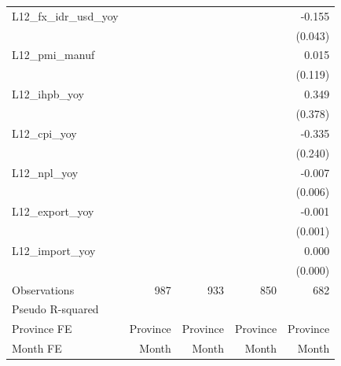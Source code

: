 {\begin{tabular}{l*{4}{D{.}{.}{-1}}}
\addlinespace
L12\_fx\_idr\_usd\_yoy&                  &                  &                  &   -0.155\sym{***}\\
                &                  &                  &                  &  (0.043)         \\
\addlinespace
L12\_pmi\_manuf   &                  &                  &                  &    0.015         \\
                &                  &                  &                  &  (0.119)         \\
\addlinespace
L12\_ihpb\_yoy    &                  &                  &                  &    0.349         \\
                &                  &                  &                  &  (0.378)         \\
\addlinespace
L12\_cpi\_yoy     &                  &                  &                  &   -0.335         \\
                &                  &                  &                  &  (0.240)         \\
\addlinespace
L12\_npl\_yoy     &                  &                  &                  &   -0.007         \\
                &                  &                  &                  &  (0.006)         \\
\addlinespace
L12\_export\_yoy  &                  &                  &                  &   -0.001         \\
                &                  &                  &                  &  (0.001)         \\
\addlinespace
L12\_import\_yoy  &                  &                  &                  &    0.000         \\
                &                  &                  &                  &  (0.000)         \\
\midrule
Observations    &      987         &      933         &      850         &      682         \\
Pseudo R-squared&                  &                  &                  &                  \\
Province FE     & Province         & Province         & Province         & Province         \\
Month FE        &    Month         &    Month         &    Month         &    Month         \\
\bottomrule
\end{tabular}
}

